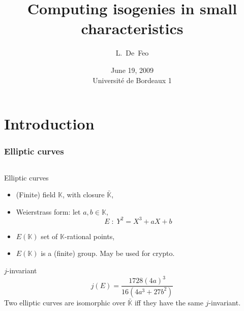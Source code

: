 \documentclass[10pt]{beamer}
\title{Computing isogenies in small characteristics}
\author[L.~De~Feo]{L.~De~Feo}
\institute[TANC, LIX]{Projet TANC, LIX, École Polytechnique, Paris, France}
\date[Bordeaux, June 19, 2009]{June 19, 2009\\Université de Bordeaux 1}
\newcommand{\clot}[1]{\bar{#1}}  %
\newcommand{\K}{\mathbb{K}}  %
\newcommand{\0}{\mathcal{O}}  %
\begin{document}
\begin{frame}
  \titlepage
\end{frame}


\section{Introduction}

\begin{frame}
  \frametitle{Elliptic curves}

  \begin{columns} 
    \begin{column}{0.55\textwidth}
      \begin{block}{Elliptic curves}
        \begin{itemize}
        \item (Finite) field $\K$, with closure $\clot{\K}$,
        \item Weierstrass form: let $a,b\in\K$, 
          \[E \;:\; Y^2 = X^3 + aX + b\]
        \item $E(\K)$ set of $\K$-rational points,
        \item $E(\K)$ is a (finite) group. May be used for crypto.
        \end{itemize}
      \end{block}

      \begin{block}{$j$-invariant}
        \[j(E) = \frac{1728(4a)^3}{16(4a^3 + 27b^2)}\]
        Two elliptic curves are isomorphic over $\clot{\K}$ iff they
        have the same $j$-invariant.
      \end{block}
  
    \end{column}


\end{columns}
\end{frame}
\end{document}

